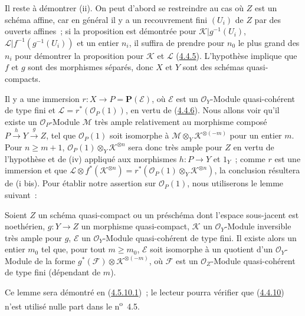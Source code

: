 Il reste à démontrer (ii). On peut d'abord se restreindre au cas où $Z$ est un
schéma affine, car en général il y a un recouvrement fini $(U_i)$ de $Z$ par
des ouverts affines~; si la proposition est démontrée pour
$\mathcal{K}|g^{-1}(U_i)$, $\mathcal{L}|f^{-1}(g^{-1}(U_i))$ et un entier
$n_i$, il suffira de prendre pour $n_0$ le plus grand des $n_i$ pour démontrer
la proposition pour $\mathcal{K}$ et $\mathcal{L}$
(\hyperref[II.4.4.5-fr]{4.4.5}). L'hypothèse implique que $f$ et $g$ sont des
morphismes séparés, donc $X$ et $Y$ sont des schémas quasi-compacts.

Il y a une immersion $r:X\to P=\mathbf{P}(\mathcal{E})$, où $\mathcal{E}$ est
un $\mathcal{O}_Y$-Module quasi-cohérent de type fini et
$\mathcal{L}=r^*(\mathcal{O}_P(1))$, en vertu de
(\hyperref[II.4.4.6-fr]{4.4.6}). Nous allons voir qu'il existe un
$\mathcal{O}_P$-Module $\mathcal{M}$ très ample relativement au morphisme
composé $P\xrightarrow{h}Y\xrightarrow{g}Z$, tel que $\mathcal{O}_P(1)$ soit
isomorphe à $\mathcal{M}\otimes_Y\mathcal{K}^{\otimes(-m)}$ pour un entier
$m$. Pour $n\geq m+1$,
$\mathcal{O}_P(1)\otimes_Y\mathcal{K}^{\otimes n}$ sera donc très ample pour
$Z$ en vertu de l'hypothèse et de (iv) appliqué aux morphismes $h:P\to Y$ et
$1_Y$~; comme $r$ est une immersion et que
$\mathcal{L}\otimes f^*(\mathcal{K}^{\otimes n})
=r^*(\mathcal{O}_P(1)\otimes_Y\mathcal{K}^{\otimes n})$, la conclusion
résultera de (i bis). Pour établir notre assertion sur $\mathcal{O}_P(1)$,
nous utiliserons le lemme suivant~:

\begin{lemma}[4.4.10.1]
\label{II.4.4.10.1-fr}
Soient $Z$ un schéma quasi-compact ou un préschéma dont l'espace sous-jacent
est noethérien, $g:Y\to Z$ un morphisme quasi-compact, $\mathcal{K}$ un
$\mathcal{O}_Y$-Module inversible très ample pour $g$, $\mathcal{E}$ un
$\mathcal{O}_Y$-Module quasi-cohérent de type fini. Il existe alors un entier
$m_0$ tel que, pour tout $m\geq m_0$, $\mathcal{E}$ soit isomorphe à un
quotient d'un $\mathcal{O}_Y$-Module de la forme
$g^*(\mathcal{F})\otimes\mathcal{K}^{\otimes(-m)}$, où $\mathcal{F}$ est un
$\mathcal{O}_Z$-Module quasi-cohérent de type fini (dépendant de $m$).
\end{lemma}

Ce lemme sera démontré en (\hyperref[II.4.5.10.1-fr]{4.5.10.1})~; le lecteur
pourra vérifier que (\hyperref[II.4.4.10-fr]{4.4.10}) n'est utilisé nulle part
dans le n\textsuperscript{o}~4.5.

